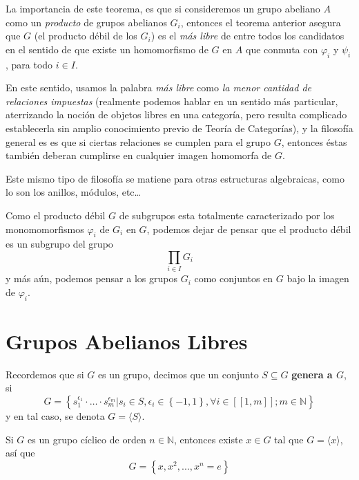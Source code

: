 \documentclass[12pt]{report}
\newcounter{it}
\theoremstyle{largebreak}
\newcommand\natint[1]{\ensuremath{\left[\!\left[ #1\right]\!\right]}}
\begin{document}
    La importancia de este teorema, es que si consideremos un grupo abeliano $A$ como un \textit{producto} de grupos abelianos $G_i$, entonces el teorema anterior asegura que $G$ (el producto débil de los $G_i$) es el \textit{más libre} de entre todos los candidatos en el sentido de que existe un homomorfismo de $G$ en $A$ que conmuta con $\varphi_i$ y $\psi_i$, para todo $i\in I$.

    En este sentido, usamos la palabra \textit{más libre} como \textit{la menor cantidad de relaciones impuestas} (realmente podemos hablar en un sentido más particular, aterrizando la noción de objetos libres en una categoría, pero resulta complicado establecerla sin amplio conocimiento previo de Teoría de Categorías), y la filosofía general es es que si ciertas relaciones se cumplen para el grupo $G$, entonces éstas también deberan cumplirse en cualquier imagen homomorfa de $G$.

    Este mismo tipo de filosofía se matiene para otras estructuras algebraicas, como lo son los anillos, módulos, etc\dots

    Como el producto débil $G$ de subgrupos esta totalmente caracterizado por los monomomorfismos $\varphi_i$ de $G_i$ en $G$, podemos dejar de pensar que el producto débil es un subgrupo del grupo
    \begin{equation*}
        \prod_{ i\in I}G_i
    \end{equation*}
    y más aún, podemos pensar a los grupos $G_i$ como conjuntos en $G$ bajo la imagen de $\varphi_i$.

    \section{Grupos Abelianos Libres}

    Recordemos que si $G$ es un grupo, decimos que un conjunto $S\subseteq G$ \textbf{genera a $G$}, si
    \begin{equation*}
        G=\left\{s_1^{\epsilon_1}\cdot\dots\cdot s_m^{\epsilon_m}\Big|s_i\in S,\epsilon_i\in\left\{-1,1\right\}, \forall i\in\natint{1,m}; m\in\mathbb{N} \right\}
    \end{equation*}
    y en tal caso, se denota $G=\langle S\rangle$. 

    \begin{exa}
        Si $G$ es un grupo cíclico de orden $n\in\mathbb{N}$, entonces existe $x\in G$ tal que $G=\langle x\rangle$, así que
        \begin{equation*}
            G=\left\{x,x^2,...,x^n=e\right\}
        \end{equation*}
    \end{exa}
\end{document}
